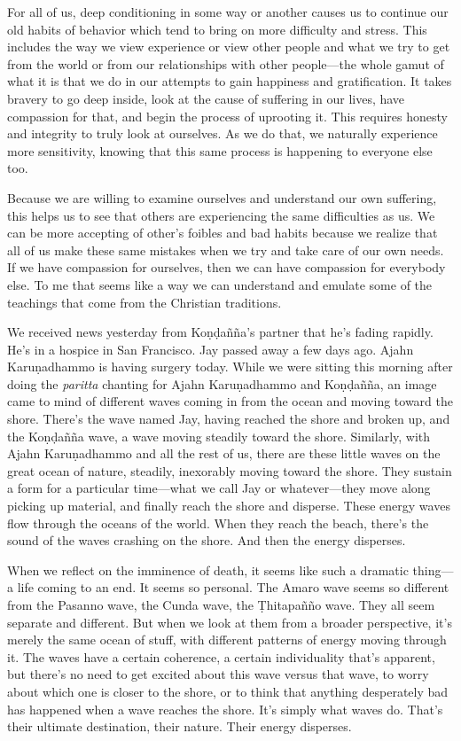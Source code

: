 For all of us, deep conditioning in some way or another causes us to 
continue our old habits of behavior which tend to bring on more 
difficulty and stress. This includes the way we view experience or view 
other people and what we try to get from the world or from our 
relationships with other people---the whole gamut of what it is that we 
do in our attempts to gain happiness and gratification. It takes 
bravery to go deep inside, look at the cause of suffering in our lives, 
have compassion for that, and begin the process of uprooting it. This 
requires honesty and integrity to truly look at ourselves. As we do 
that, we naturally experience more sensitivity, knowing that this same 
process is happening to everyone else too.

Because we are willing to examine ourselves and understand our own 
suffering, this helps us to see that others are experiencing the same 
difficulties as us. We can be more accepting of other's foibles and bad 
habits because we realize that all of us make these same mistakes when 
we try and take care of our own needs. If we have compassion for 
ourselves, then we can have compassion for everybody else. To me that 
seems like a way we can understand and emulate some of the teachings 
that come from the Christian traditions.


We received news yesterday from Koṇḍañña's partner that he's 
fading rapidly. He's in a hospice in San Francisco. Jay passed away a 
few days ago. Ajahn Karuṇadhammo is having surgery today. While we 
were sitting this morning after doing the \emph{paritta} chanting for 
Ajahn Karuṇadhammo and Koṇḍañña, an image came to mind of 
different waves coming in from the ocean and moving toward the shore. 
There's the wave named Jay, having reached the shore and broken up, and 
the Koṇḍañña wave, a wave moving steadily toward the shore. 
Similarly, with Ajahn Karuṇadhammo and all the rest of us, there are 
these little waves on the great ocean of nature, steadily, inexorably 
moving toward the shore. They sustain a form for a particular 
time---what we call Jay or whatever---they move along picking up 
material, and finally reach the shore and disperse. These energy waves 
flow through the oceans of the world. When they reach the beach, 
there's the sound of the waves crashing on the shore. And then the 
energy disperses.

When we reflect on the imminence of death, it seems like such a 
dramatic thing---a life coming to an end. It seems so personal. The 
Amaro wave seems so different from the Pasanno wave, the Cunda wave, 
the Ṭhitapañño wave. They all seem separate and different. But when 
we look at them from a broader perspective, it's merely the same ocean 
of stuff, with different patterns of energy moving through it. The 
waves have a certain coherence, a certain individuality that's 
apparent, but there's no need to get excited about this wave versus 
that wave, to worry about which one is closer to the shore, or to think 
that anything desperately bad has happened when a wave reaches the 
shore. It's simply what waves do. That's their ultimate destination, 
their nature. Their energy disperses.

